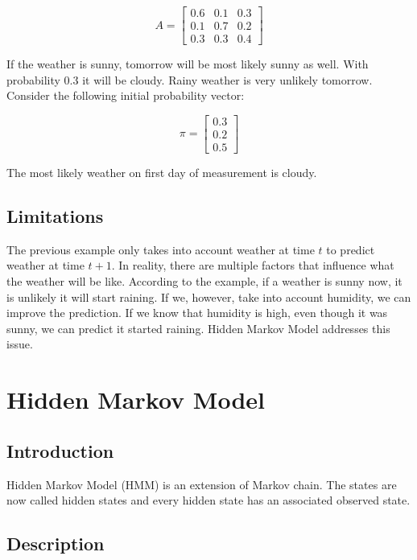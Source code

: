 \documentclass[thesis=B,english]{FITthesis}[2012/06/26]
\begin{document}
\begin{equation}
A =
\begin{bmatrix}
	0.6	& 0.1 & 0.3 \\
	0.1 & 0.7 & 0.2 \\
	0.3 & 0.3 & 0.4
\end{bmatrix}
\end{equation}

If the weather is sunny, tomorrow will be most likely sunny as well. With probability 0.3 it will be cloudy. Rainy weather is very unlikely tomorrow. Consider the following initial probability vector:

\begin{equation}
\pi = \begin{bmatrix} 0.3 \\ 0.2 \\ 0.5 \end{bmatrix}
\end{equation}

The most likely weather on first day of measurement is cloudy.

\subsection{Limitations}

The previous example only takes into account weather at time $t$ to predict weather at time $t+1$. In reality, there are multiple factors that influence what the weather will be like. According to the example, if a weather is sunny now, it is unlikely it will start raining. If we, however, take into account humidity, we can improve the prediction. If we know that humidity is high, even though it was sunny, we can predict it started raining. Hidden Markov Model addresses this issue.

\section{Hidden Markov Model}

\subsection{Introduction}

Hidden Markov Model (HMM) is an extension of Markov chain. The states are now called hidden states and every hidden state has an associated observed state.

\subsection{Description}
\end{document}
